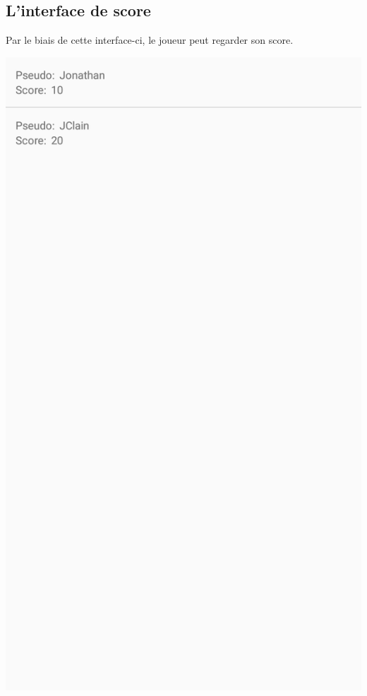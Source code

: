 \documentclass[a4paper]{article}
\begin{document}
\subsection{L'interface de score}
Par le biais de cette interface-ci, le joueur peut regarder son score.
\begin{center}
  \includegraphics[scale=0.20]{images/2.png}
\end{center}
\end{document}
